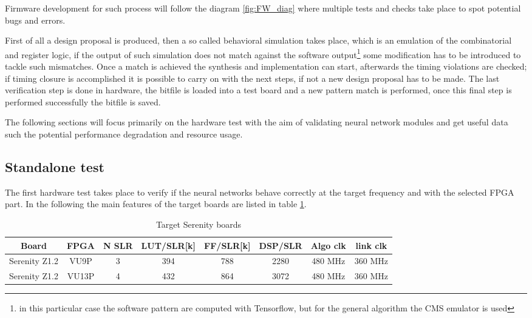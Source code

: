 \documentclass[../../main.tex]{subfiles}
\begin{document}
Firmware development for such process will follow the diagram \ref{fig:FW_diag} where multiple tests and checks take place to spot potential bugs and errors.  


First of all a design proposal is produced, then a so called behavioral simulation takes place, which is an emulation of the combinatorial and register logic, if the output of such simulation does not match against the software output\footnote{in this particular case the software pattern are computed with Tensorflow, but for the general algorithm the CMS emulator is used} some modification has to be introduced to tackle such mismatches.  
Once a match is achieved the synthesis and implementation can start, afterwards the timing violations are checked; if timing closure is accomplished it is possible to carry on with the next steps, if not a new design proposal has to be made.
The last verification step is done in hardware, the bitfile is loaded into a test board and a new pattern match is performed, once this final step is performed successfully the bitfile is saved.  

The following sections will focus primarily on the hardware test with the aim of validating neural network modules and get useful data such the potential performance degradation and resource usage.

\subsection{Standalone test}
\label{sec:P2GT_test_st}
The first hardware test takes place to verify if the neural networks behave correctly at the target frequency and with the selected FPGA part. In the following the main features of the target boards are listed in table \ref{tab:serenity_boards}.  

\begin{center}
    \begin{table}[h]
    \begin{tabular}{|c|c|c|c|c|c|c|c|}
        \hline
        Board & FPGA & N SLR & LUT/SLR[k] & FF/SLR[k] & DSP/SLR & Algo clk & link clk \\ 
        \hline \hline
        Serenity Z1.2 & VU9P  & 3  & 394 & 788 & 2280 & 480 MHz & 360 MHz \\
        Serenity Z1.2 & VU13P & 4  & 432 & 864 & 3072 & 480 MHz & 360 MHz \\
        \hline
    \end{tabular}
    \caption{Target Serenity boards}
    \label{tab:serenity_boards}
    \end{table}
\end{center}
  
\end{document}
